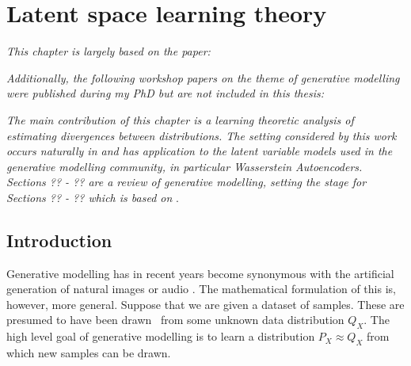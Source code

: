 \chapter{Latent space learning theory} %

\ifpdf
    \graphicspath{{Chapter5/Figs/Raster/}{Chapter5/Figs/PDF/}{Chapter5/Figs/}}
\else
    \graphicspath{{Chapter5/Figs/Vector/}{Chapter5/Figs/}}
\fi

\emph{This chapter is largely based on the paper:}

\begin{quote}
\end{quote}

\emph{Additionally, the following workshop papers on the theme of generative modelling were published during my PhD but are not included in this thesis:}

\begin{quote}
\end{quote}

\begin{quote}
\end{quote}

\emph{The main contribution of this chapter is a learning theoretic analysis of estimating divergences between distributions. 
The setting considered by this work occurs naturally in and has application to the latent variable models used in the generative modelling community, in particular Wasserstein Autoencoders.
Sections ?? - ?? are a review of generative modelling, setting the stage for Sections ?? - ?? which is based on} \cite{rubenstein2019practical}.



\section{Introduction}

Generative modelling has in recent years become synonymous with the artificial generation of natural images or audio \cite{something_for_images, wavenet?}.
The mathematical formulation of this is, however, more general.
Suppose that we are given a dataset of samples. 
These are presumed to have been drawn \iid~from some unknown data distribution $Q_X$.
The high level goal of generative modelling is to learn a distribution $P_X \approx Q_X$ from which new samples can be drawn. 

